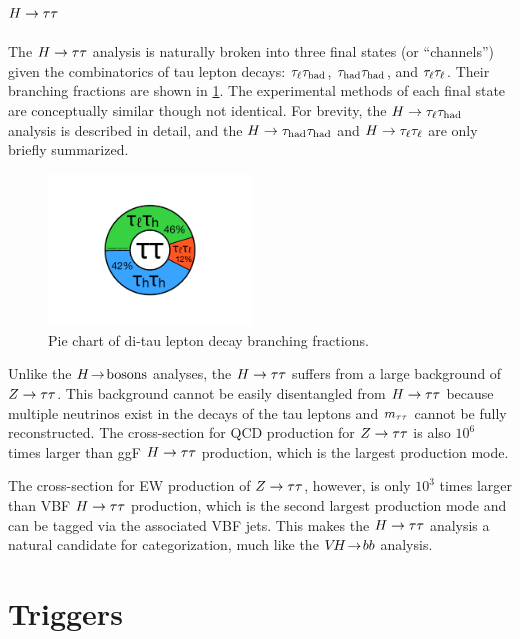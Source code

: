 \subsection{$H\rightarrow\tau\tau$}
\label{sec:strategy-htautau}

The $H\rightarrow\tau\tau$ analysis is naturally broken into three final states (or ``channels'') given the combinatorics of tau lepton decays: $\tau_\ell\tau_\text{had}$, $\tau_\text{had}\tau_\text{had}$, and $\tau_\ell\tau_\ell$. Their branching fractions are shown in \cref{fig:strategy-decaypie}. The experimental methods of each final state are conceptually similar though not identical. For brevity, the $H\rightarrow\tau_\ell\tau_\text{had}$ analysis is described in detail, and the $H\rightarrow\tau_\text{had}\tau_\text{had}$ and $H\rightarrow\tau_\ell\tau_\ell$ are only briefly summarized.

\begin{figure}[tp]
  \centering
  \includegraphics[width=0.48\textwidth]{figures/piecharts/tautaudecay}
  \caption{Pie chart of di-tau lepton decay branching fractions.}
  \label{fig:strategy-decaypie}
\end{figure}

Unlike the $H \!\rightarrow\! \text{bosons}$ analyses, the $H\rightarrow\tau\tau$ suffers from a large background of $Z\rightarrow\tau\tau$. This background cannot be easily disentangled from $H\rightarrow\tau\tau$ because multiple neutrinos exist in the decays of the tau leptons and $m_{\tau\tau}$ cannot be fully reconstructed. The cross-section for QCD production for $Z\rightarrow\tau\tau$ is also $10^6$ times larger than ggF $H\rightarrow\tau\tau$ production, which is the largest production mode.

The cross-section for EW production of $Z\rightarrow\tau\tau$, however, is only $10^3$ times larger than VBF $H\rightarrow\tau\tau$ production, which is the second largest production mode and can be tagged via the associated VBF jets. This makes the $H\rightarrow\tau\tau$ analysis a natural candidate for categorization, much like the $V\!H \!\rightarrow\! bb$ analysis.

\section{Triggers}
\label{sec:strategy-triggers}

